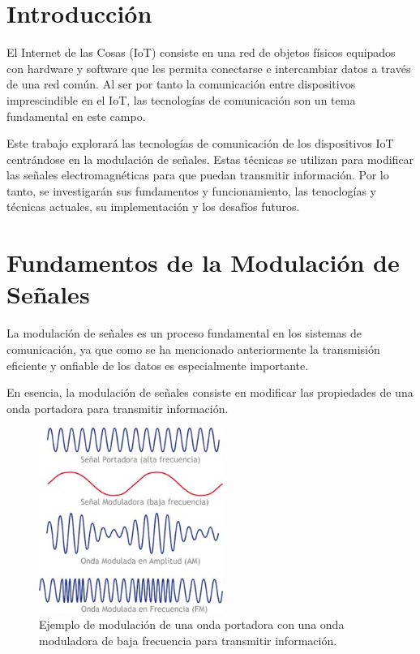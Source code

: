 \documentclass[12pt, letterpaper]{article}
\title{\doctitle}
\author{Juan Luis Serradilla Tormos}
\date{\monthname[\month] de \the\year}
\begin{document}
\pagestyle{fancy}

\maketitle

\newpage
\tableofcontents

\newpage
\section{Introducción}
El Internet de las Cosas (IoT) consiste en una red de objetos físicos equipados con hardware y software que les permita conectarse e intercambiar datos a través de una red común. Al ser por tanto la comunicación entre dispositivos imprescindible en el IoT, las tecnologías de comunicación son un tema fundamental en este campo.

Este trabajo explorará las tecnologías de comunicación de los dispositivos IoT centrándose en la modulación de señales. Estas técnicas se utilizan para modificar las señales electromagnéticas para que puedan transmitir información. Por lo tanto, se investigarán sus fundamentos y funcionamiento, las tenoclogías y técnicas actuales, su implementación y los desafíos futuros.


\vspace{1em}
\section{Fundamentos de la Modulación de Señales}

La modulación de señales es un proceso fundamental en los sistemas de comunicación, ya que como se ha mencionado anteriormente la transmisión eficiente y onfiable de los datos es especialmente importante.

En esencia, la modulación de señales consiste en modificar las propiedades de una onda portadora para transmitir información. 

\newpage
\begin{figure}[h]
    \centering
    \includegraphics[width=6cm]{images/modulacion_ejemplo.jpg}
    \caption{Ejemplo de modulación de una onda portadora con una onda moduladora de baja frecuencia para transmitir información.}\label{fig:modulacion_ejemplo}
\end{figure}
\end{document}
